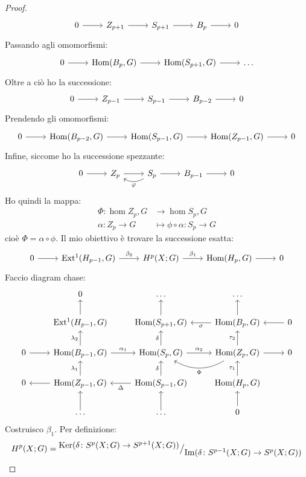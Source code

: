 \begin{proof}
  \[
    \begin{tikzcd}
      0 \rar & Z_{p+1} \rar & S_{p+1} \rar & B_p \rar & 0
    \end{tikzcd}
  \]
  Passando agli omomorfismi:
  \[
    \begin{tikzcd}
      0 \rar & \hom{B_p, G } \rar & \hom{S_{p+1}, G} \rar & \dots
    \end{tikzcd}
  \]
  Oltre a ciò ho la successione:
  \[
    \begin{tikzcd}
      0 \rar & Z_{p-1} \rar & S_{p-1} \rar & B_{p-2} \rar & 0
    \end{tikzcd}
  \]
  Prendendo gli omomorfismi:
  \[
    \begin{tikzcd}
      0 \rar & \hom{B_{p-2}, G} \rar & \hom{S_{p-1}, G} \rar & \hom{Z_{p-1}, G} \rar & 0
    \end{tikzcd}
  \]
  Infine, siccome ho la successione spezzante:
  \[
    \begin{tikzcd}
      0 \rar & Z_p \rar & S_p \arrow[bend left]{l}{\phi} \rar & B_{p-1} \rar & 0
    \end{tikzcd}
  \]
  Ho quindi la mappa:
  \begin{align*}
    \Phi \colon \hom{Z_p, G} & \to \hom{S_p, G} \\
    \alpha \colon Z_p \to G & \mapsto \phi \circ \alpha \colon S_p \to G
  \end{align*}
  cioè $ \Phi = \alpha \circ \phi $.
  Il mio obiettivo è trovare la successione esatta:
  \[
    \begin{tikzcd}
      0 \rar & \ext{H_{p-1}, G} \rar{\beta_2} & H^p(X; G) \rar{\beta_1} & \hom{H_p, G} \rar & 0
    \end{tikzcd}
  \]
  Faccio diagram chase:
  \[
    \begin{tikzcd}
      {} & 0 & \dots & \dots & {} \\
      {} & \ext{H_{p-1},G} \uar & \hom{S_{p+1},G} \uar & \lar{\sigma} \hom{B_p,G} \uar & 0 \lar \\
      0 \rar & \hom{B_{p-1}, G} \uar{\lambda_2} \rar{\alpha_1} & \rar{\alpha_2} \hom{S_p,G} \uar{\delta} & \hom{Z_p,G} \rar \uar{\tau_2} \arrow[bend left]{l}{\Phi}  & 0 \\
      0 & \lar \hom{Z_{p-1}, G} \uar{\lambda_1} & \lar{\Delta} \hom{S_{p-1},G} \uar{\delta} & \hom{H_p,G} \uar{\tau_1}  & {} \\
      {} & \dots \uar & \dots \uar & 0 \uar{} & {}
    \end{tikzcd}
  \]
  Costruisco $ \beta_1 $.
  Per definizione:
  \[
    H^p(X;G) = {^{\textstyle \mathrm{Ker}( \delta\colon S^p(X;G) \to S^{p+1}(X;G))}\big/_{\textstyle \mathrm{Im}( \delta \colon S^{p-1}(X;G) \to S^p(X;G) )}}
\]
\end{proof}
